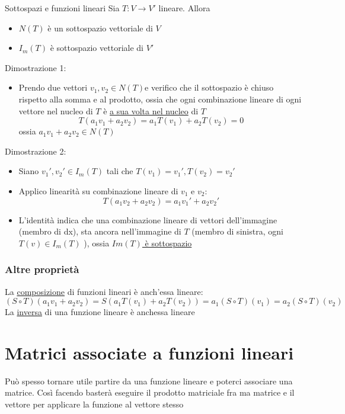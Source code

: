 \begin{teorema}{Sottospazi e funzioni lineari}
	Sia $ T : V \to V'$ lineare. Allora
	\begin{itemize}
		\item $  N \left( T \right)  $ è un sottospazio vettoriale di $ V $
		\item $ I_m \left( T \right)  $ è sottospazio vettoriale di $ V' $
	\end{itemize}
\end{teorema}
Dimostrazione 1:
\begin{itemize}
	\item Prendo due vettori $ v_1,v_2 \in N\left( T \right)  $e verifico che il sottospazio è chiuso rispetto alla somma e al prodotto, ossia che ogni combinazione lineare di ogni vettore nel nucleo di $ T $ è \underline{a sua volta nel nucleo} di $ T $
	      \[
		      T\left( a_1v_1 + a_2v_2 \right) =a_1T\left( v_1 \right) + a_2T\left( v_2 \right) =0
	      \]
	      ossia $  a_1v_1 + a_2v_2 \in  N\left( T \right) $
\end{itemize}
Dimostrazione 2:
\begin{itemize}
	\item Siano $ v_1', v_2' \in  I_m \left( T \right)  $ tali che $  T\left( v_1 \right) = v_1', T\left( v_2 \right) = v_2' $
	\item Applico linearità su combinazione lineare di $ v_1 $ e $ v_2 $:
	      \[
		      T\left( a_1 v_2 + a_2 v_2 \right) = a_1v_1' + a_2v_2'
	      \]
	\item L'identità indica che una combinazione lineare di vettori dell'immagine (membro di dx), sta ancora nell'immagine di $ T $ (membro di sinistra, ogni $ T\left( v \right)  \in I_m\left( T \right) $ ), ossia \underline{ $ Im \left( T \right)  $ è sottospazio}
\end{itemize}
\subsubsection*{Altre proprietà}
La \underline{composizione} di funzioni lineari è anch'essa lineare:
\[
	(S \circ T)\left(a_1 v_1+a_2 v_2\right)=S\left(a_1 T\left(v_1\right)+a_2 T\left(v_2\right)\right) = a_1 \left( S \circ T \right)  \left( v_1 \right) = a_2 \left( S \circ T \right)  \left( v_2 \right)
\]
La \underline{inversa} di una funzione lineare è anchessa lineare
\section{Matrici associate a funzioni lineari}
Può spesso tornare utile partire da una funzione lineare e poterci associare una matrice. Così facendo basterà eseguire il prodotto matriciale fra ma matrice e il vettore per applicare la funzione al vettore stesso

